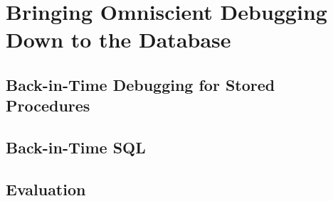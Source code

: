 \chapter{Bringing Omniscient Debugging Down to the Database}

\section{Back-in-Time Debugging for Stored Procedures}

\section{Back-in-Time SQL}

\section{Evaluation}
